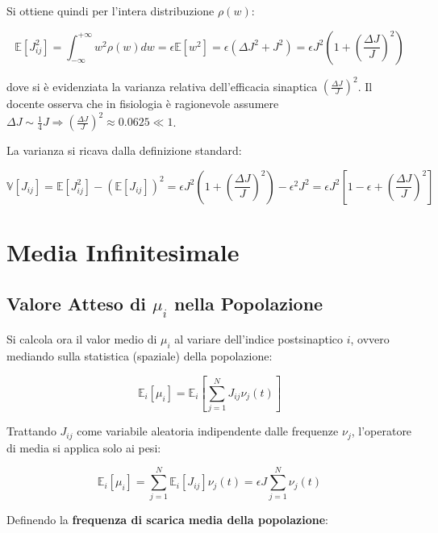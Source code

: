 Si ottiene quindi per l'intera distribuzione $\rho(w)$:

\begin{equation}
\mathbb{E}[J_{ij}^2] = \int_{-\infty}^{+\infty} w^2 \rho(w) dw = \epsilon \mathbb{E}[w^2] = \epsilon \left( \Delta J^2 + J^2 \right) = \epsilon J^2 \left( 1 + \left(\frac{\Delta J}{J}\right)^2 \right)
\end{equation}

dove si è evidenziata la varianza relativa dell'efficacia sinaptica $\left(\frac{\Delta J}{J}\right)^2$. Il docente osserva che in fisiologia è ragionevole assumere $\Delta J \sim \frac{1}{4}J \Rightarrow \left(\frac{\Delta J}{J}\right)^2 \approx 0.0625 \ll 1$.

La varianza si ricava dalla definizione standard:

\begin{equation}
\mathbb{V}[J_{ij}] = \mathbb{E}[J_{ij}^2] - (\mathbb{E}[J_{ij}])^2 = \epsilon J^2 \left( 1 + \left(\frac{\Delta J}{J}\right)^2 \right) - \epsilon^2 J^2 = \epsilon J^2 \left[ 1 - \epsilon + \left(\frac{\Delta J}{J}\right)^2 \right]
\end{equation}

\section{Media Infinitesimale}
\subsection{Valore Atteso di $\mu_i$ nella Popolazione}

Si calcola ora il valor medio di $\mu_i$ al variare dell'indice postsinaptico $i$, ovvero mediando sulla statistica (spaziale) della popolazione:

\begin{equation}
\mathbb{E}_i[\mu_i] = \mathbb{E}_i\left[ \sum_{j=1}^{N} J_{ij} \nu_j(t) \right]
\end{equation}

Trattando $J_{ij}$ come variabile aleatoria indipendente dalle frequenze $\nu_j$, l'operatore di media si applica solo ai pesi:

\begin{equation}
\mathbb{E}_i[\mu_i] = \sum_{j=1}^{N} \mathbb{E}_i[J_{ij}] \nu_j(t) = \epsilon J \sum_{j=1}^{N} \nu_j(t)
\end{equation}

Definendo la \textbf{frequenza di scarica media della popolazione}:

